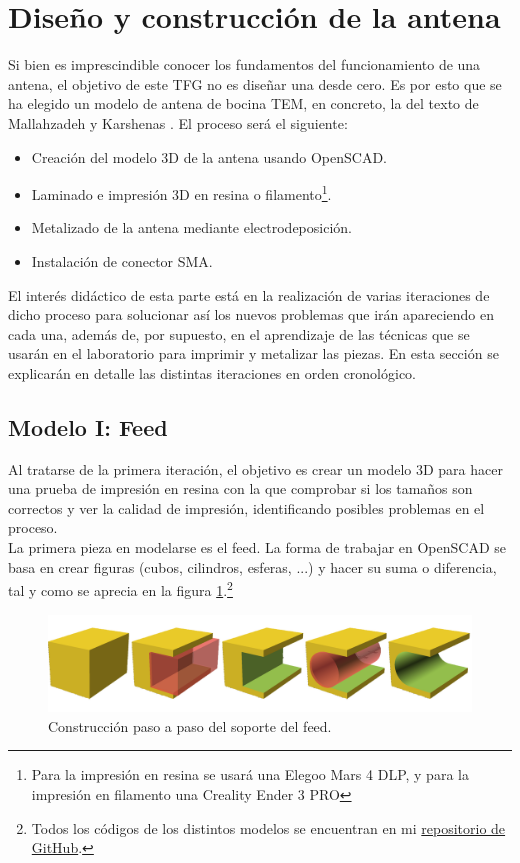 \documentclass[11pt,a4paper,twoside,pdf]{article}
\numberwithin{equation}{section}
\begin{document}
\section{Diseño y construcción de la antena}

Si bien es imprescindible conocer los fundamentos del funcionamiento de una antena, el objetivo de este TFG no es diseñar una desde cero. Es por esto que se ha elegido un modelo de antena de bocina TEM, en concreto, la del texto de Mallahzadeh y Karshenas \cite{tem_horn}. El proceso será el siguiente:
\begin{itemize}
    \item[1.] Creación del modelo 3D de la antena usando OpenSCAD.
    \item[2.] Laminado e impresión 3D en resina o filamento\footnote{Para la impresión en resina se usará una Elegoo Mars 4 DLP, y para la impresión en filamento una Creality Ender 3 PRO}.
    \item[3.] Metalizado de la antena mediante electrodeposición.
    \item[4.] Instalación de conector SMA.
\end{itemize}
El interés didáctico de esta parte está en la realización de varias iteraciones de dicho proceso para solucionar así los nuevos problemas que irán apareciendo en cada una, además de, por supuesto, en el aprendizaje de las técnicas que se usarán en el laboratorio para imprimir y metalizar las piezas. En esta sección se explicarán en detalle las distintas iteraciones en orden cronológico.

\subsection{Modelo I: Feed}

Al tratarse de la primera iteración, el objetivo es crear un modelo 3D para hacer una prueba de impresión en resina con la que comprobar si los tamaños son correctos y ver la calidad de impresión, identificando posibles problemas en el proceso.\\

La primera pieza en modelarse es el feed. La forma de trabajar en OpenSCAD se basa en crear figuras (cubos, cilindros, esferas, ...) y hacer su suma o diferencia, tal y como se aprecia en la figura \ref{fig:construcFeed}.\footnote{Todos los códigos de los distintos modelos se encuentran en mi \href{https://github.com/Alex-ZM/TEM_Horn_Antenna}{repositorio de GitHub}.}
\begin{figure}[!h]
    \centering
    \includegraphics[width=\linewidth]{img/modelos/SoporteFeed/collageFeed.png}
    \caption{Construcción paso a paso del soporte del feed.}
    \label{fig:construcFeed}
\end{figure}
\end{document}
